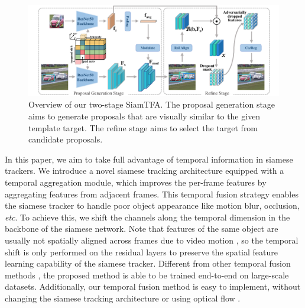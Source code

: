 \begin{figure}[t]
    \centering
    \includegraphics[width=1.0\textwidth]{Img/end/net_v3.pdf}
    \caption{
    Overview of our two-stage SiamTFA.
    The proposal generation stage aims to generate proposals that are visually similar to the given template target. The refine stage aims to select the target from candidate proposals.}
    \label{fig:SiamTFA}
\end{figure}

In this paper, we aim to take full advantage of temporal information in siamese trackers.
We introduce a novel siamese tracking architecture equipped with a temporal aggregation module, which improves the per-frame features by aggregating features from adjacent frames.
This temporal fusion strategy enables the siamese tracker to handle poor object appearance like motion blur, occlusion, \textit{etc}.
To achieve this, we shift the channels along the temporal dimension \cite{lin2019tsm} in the backbone of the siamese network.
Note that features of the same object are usually not spatially aligned across frames due to video motion \cite{zhu2017flow}, so the temporal shift is only performed on the residual layers \cite{lin2019tsm} to preserve the spatial feature learning capability of the siamese tracker.
Different from other temporal fusion methods \cite{tao2016siamese, gladh2016deep}, the proposed method is able to be trained end-to-end on large-scale datasets.
Additionally, our temporal fusion method is easy to implement, without changing the siamese tracking architecture or using optical flow \cite{zhu2018end}.

